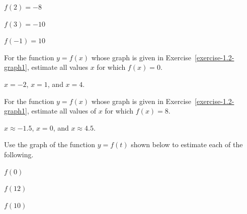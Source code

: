 \begin{solution}
\begin{parts}
\item $f(2) = -8$
\item $f(3) = -10$
\item $f(-1) = 10$
\end{parts}
\end{solution}








\begin{exercise}
For the function $y=f(x)$ whose graph is given in Exercise~\ref{exercise-1.2-graph1}, estimate all values $x$ for which $f(x)=0$.
\end{exercise}

\begin{solution}
$x=-2$, $x=1$, and $x=4$.
\end{solution}







\begin{exercise}
For the function $y=f(x)$ whose graph is given in Exercise~\ref{exercise-1.2-graph1}, estimate all values of $x$ for which $f(x)=8$.
\end{exercise}

\begin{solution}
$x\approx -1.5$, $x=0$, and $x\approx 4.5$.
\end{solution}








\begin{exercise}\label{exercise-1.2-graph2}
Use the graph of the function $y = f(t)$ shown below to estimate each of the following.
    \begin{parts}
        \item $f(0)$
        \item $f(12)$
        \item $f(10)$
    \end{parts}
        \begin{center}
        \end{center}

\end{exercise}



